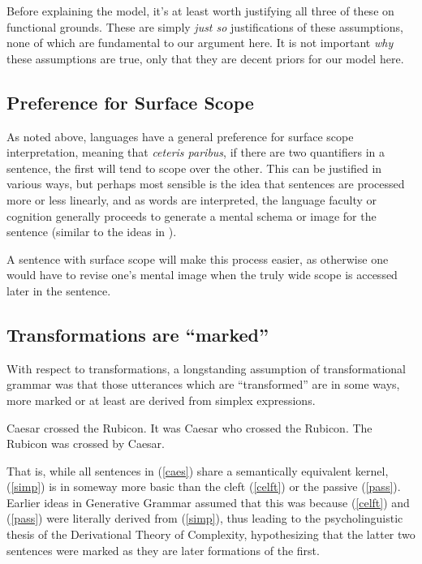 \documentclass{article}
\begin{document}
Before explaining the model, it's at least worth justifying all three of these on functional grounds.
These are simply \textit{just so} justifications of these assumptions, none of which are fundamental to our argument here.
It is not important \emph{why} these assumptions are true, only that they are decent priors for our model here.

\subsection{Preference for Surface Scope}

As noted above, languages have a general preference for surface scope interpretation, meaning that \textit{ceteris paribus}, if there are two quantifiers in a sentence, the first will tend to scope over the other.
This can be justified in various ways, but perhaps most sensible is the idea that sentences are processed more or less linearly, and as words are interpreted, the language faculty or cognition generally proceeds to generate a mental schema or image for the sentence (similar to the ideas in \textcite{langacker87}).

A sentence with surface scope will make this process easier, as otherwise one would have to revise one's mental image when the truly wide scope is accessed later in the sentence.

\subsection{Transformations are ``marked''}

With respect to transformations, a longstanding assumption of transformational grammar was that those utterances which are ``transformed'' are in some ways, more marked or at least are derived from simplex expressions.

\begin{exe}
	\ex\label{caes}
	\begin{xlist}
	\ex Caesar crossed the Rubicon.\label{simp}
	\ex It was Caesar who crossed the Rubicon.\label{celft}
	\ex The Rubicon was crossed by Caesar.\label{pass}
	\end{xlist}
\end{exe}

That is, while all sentences in (\ref{caes}) share a semantically equivalent kernel, (\ref{simp}) is in someway more basic than the cleft (\ref{celft}) or the passive (\ref{pass}).
Earlier ideas in Generative Grammar assumed that this was because (\ref{celft}) and (\ref{pass}) were literally derived from (\ref{simp}), thus leading to the psycholinguistic thesis of the Derivational Theory of Complexity, hypothesizing that the latter two sentences were marked as they are later formations of the first.
\end{document}
